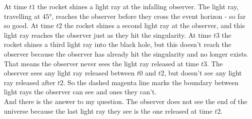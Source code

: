 At time $t1$ the rocket shines a light ray at the infalling observer. The light ray, travelling at $45°$, reaches the observer before they cross the event horizon - so far so good. At time $t2$ the rocket shines a second light ray at the observer, and this light ray reaches the observer just as they hit the singularity. At time $t3$ the rocket shines a third light ray into the black hole, but this doesn't reach the observer because the observer has already hit the singularity and no longer exists. That means the observer never sees the light ray released at time $t3$. The observer sees any light ray released between $t0$ and $t2$, but doesn't see any light ray released after $t2$. So the dashed magenta line marks the boundary between light rays the observer can see and ones they can't.\\

And there is the answer to my question. The observer does not see the end of the universe because the last light ray they see is the one released at time $t2$.




















